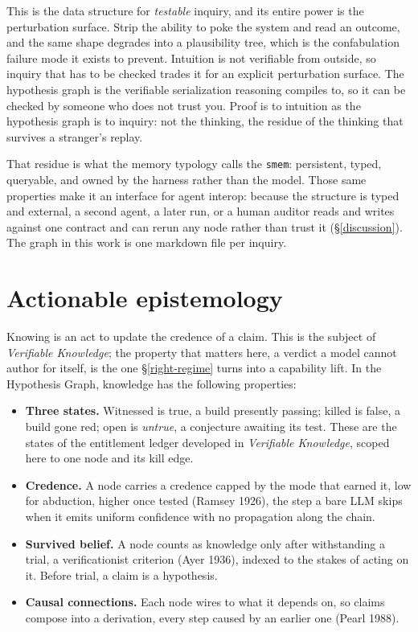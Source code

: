 \documentclass[
  10pt,
]{article}
\providecommand{\tightlist}{%
  \setlength{\itemsep}{0pt}\setlength{\parskip}{0pt}}
\begin{document}
This is the data structure for \emph{testable} inquiry, and its entire
power is the perturbation surface. Strip the ability to poke the system
and read an outcome, and the same shape degrades into a plausibility
tree, which is the confabulation failure mode it exists to prevent.
Intuition is not verifiable from outside, so inquiry that has to be
checked trades it for an explicit perturbation surface. The hypothesis
graph is the verifiable serialization reasoning compiles to, so it can
be checked by someone who does not trust you. Proof is to intuition as
the hypothesis graph is to inquiry: not the thinking, the residue of the
thinking that survives a stranger's replay.

That residue is what the memory typology calls the \texttt{smem}:
persistent, typed, queryable, and owned by the harness rather than the
model. Those same properties make it an interface for agent interop:
because the structure is typed and external, a second agent, a later
run, or a human auditor reads and writes against one contract and can
rerun any node rather than trust it (\S\ref{discussion}). The graph in
this work is one markdown file per inquiry.

\section{Actionable epistemology}\label{epistemics}

Knowing is an act to update the credence of a claim. This is the subject
of \emph{Verifiable Knowledge}; the property that matters here, a
verdict a model cannot author for itself, is the one
\S\ref{right-regime} turns into a capability lift. In the Hypothesis
Graph, knowledge has the following properties:

\begin{itemize}
\tightlist
\item
  \textbf{Three states.} Witnessed is true, a build presently passing;
  killed is false, a build gone red; open is \emph{untrue}, a conjecture
  awaiting its test. These are the states of the entitlement ledger
  developed in \emph{Verifiable Knowledge}, scoped here to one node and
  its kill edge.
\item
  \textbf{Credence.} A node carries a credence capped by the mode that
  earned it, low for abduction, higher once tested (Ramsey 1926), the
  step a bare LLM skips when it emits uniform confidence with no
  propagation along the chain.
\item
  \textbf{Survived belief.} A node counts as knowledge only after
  withstanding a trial, a verificationist criterion (Ayer 1936), indexed
  to the stakes of acting on it. Before trial, a claim is a hypothesis.
\item
  \textbf{Causal connections.} Each node wires to what it depends on, so
  claims compose into a derivation, every step caused by an earlier one
  (Pearl 1988).
\end{itemize}
\end{document}
